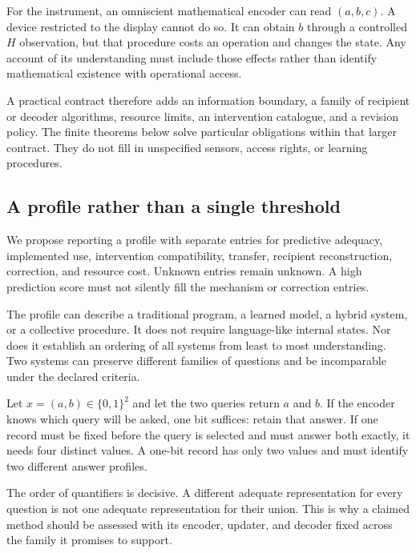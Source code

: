 For the instrument, an omniscient mathematical encoder can read $(a,b,c)$. A device restricted to the display cannot do so. It can obtain $b$ through a controlled $H$ observation, but that procedure costs an operation and changes the state. Any account of its understanding must include those effects rather than identify mathematical existence with operational access.

A practical contract therefore adds an information boundary, a family of recipient or decoder algorithms, resource limits, an intervention catalogue, and a revision policy. The finite theorems below solve particular obligations within that larger contract. They do not fill in unspecified sensors, access rights, or learning procedures.

\subsection{A profile rather than a single threshold}
We propose reporting a profile with separate entries for predictive adequacy, implemented use, intervention compatibility, transfer, recipient reconstruction, correction, and resource cost. Unknown entries remain unknown. A high prediction score must not silently fill the mechanism or correction entries.

The profile can describe a traditional program, a learned model, a hybrid system, or a collective procedure. It does not require language-like internal states. Nor does it establish an ordering of all systems from least to most understanding. Two systems can preserve different families of questions and be incomparable under the declared criteria.

\begin{MUcounterexample}\label{MU:ex:joint}
Let $x=(a,b)\in\{0,1\}^2$ and let the two queries return $a$ and $b$. If the encoder knows which query will be asked, one bit suffices: retain that answer. If one record must be fixed before the query is selected and must answer both exactly, it needs four distinct values. A one-bit record has only two values and must identify two different answer profiles.
\end{MUcounterexample}
The order of quantifiers is decisive. A different adequate representation for every question is not one adequate representation for their union. This is why a claimed method should be assessed with its encoder, updater, and decoder fixed across the family it promises to support.

